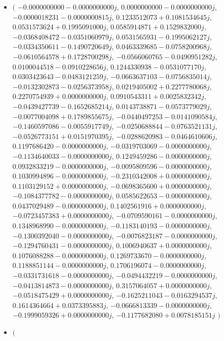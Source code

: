 \documentclass[14pt,a4paper]{article}
\begin{document}
\begin{itemize}
\item
$\big($
$-0.0000000000-0.0000000000j$, $0.0000000000-0.0000000000j$, $-0.0000018231-0.0000000815j$, $0.1233512073+0.1081534645j$, $0.0531573624+0.1995091000j$, $0.0585914871+0.1529832000j$, $-0.0368408472-0.0351060979j$, $0.0531565931-0.1995062127j$, $-0.0334350611-0.1490720649j$, $0.0463339685-0.0758200968j$, $-0.0610564578+0.1728700298j$, $-0.0566060765-0.0490951282j$, $0.0100044518-0.0910228656j$, $0.1244330938-0.0531077170j$, $0.0303423643-0.0483121259j$, $-0.0663637103-0.0756835014j$, $-0.0132302873-0.0256373958j$, $0.0219405002+0.2277780068j$, $0.2270754939+0.0000000000j$, $0.0910543311+0.0025832342j$, $-0.0439427739-0.1652685214j$, $0.0143738871-0.0573779029j$, $-0.0077004098+0.1789855675j$, $-0.0440497253-0.0141090584j$, $-0.1460597086-0.0055917749j$, $-0.0250688844-0.0763521131j$, $-0.0526773151+0.0151970395j$, $-0.0288620983-0.0464610606j$, $0.1197686420-0.0000000000j$, $-0.0319703069-0.0000000000j$, $-0.1134640033-0.0000000000j$, $0.1249459286-0.0000000000j$, $0.0932833219-0.0000000000j$, $-0.0095809596-0.0000000000j$, $0.1030994896-0.0000000000j$, $-0.2310342008+0.0000000000j$, $0.1103129152+0.0000000000j$, $-0.0698365600+0.0000000000j$, $-0.1084377782-0.0000000000j$, $0.0585622653-0.0000000000j$, $0.0437029489-0.0000000000j$, $0.1402561916+0.0000000000j$, $-0.0723457383+0.0000000000j$, $-0.0709590161-0.0000000000j$, $0.1348968990-0.0000000000j$, $-0.1183140193-0.0000000000j$, $-0.1300392040-0.0000000000j$, $-0.0076823187-0.0000000000j$, $-0.1294760431-0.0000000000j$, $0.1006940637+0.0000000000j$, $0.1076088288-0.0000000000j$, $0.1269733670-0.0000000000j$, $0.1188851144-0.0000000000j$, $0.1706196074-0.0000000000j$, $-0.0331731618-0.0000000000j$, $-0.0494432219-0.0000000000j$, $-0.0413814873-0.0000000000j$, $0.3157064057+0.0000000000j$, $-0.0518475429+0.0000000000j$, $-0.1625211043-0.0163294537j$, $0.1614364664+0.0373395883j$, $-0.0666813339-0.0000000000j$, $-0.1999059326+0.0000000000j$, $-0.1177682080+0.0078185151j$
$\big)$
\item
$\big($

\end{itemize}
\end{document}
